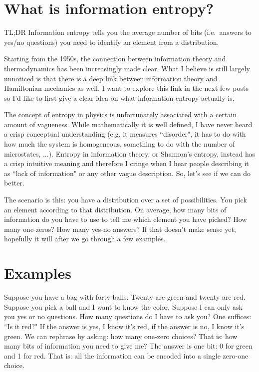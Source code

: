 \documentclass[aps,pra,10pt,floatfix,nofootinbib]{revtex4-1}
\theoremstyle{definition}
\begin{document}
	
\section{What is information entropy?}

TL;DR Information entropy tells you the average number of bits (i.e.~answers to yes/no questions) you need to identify an element from a distribution.

Starting from the 1950s, the connection between information theory and thermodynamics has been increasingly made clear. What I believe is still largely unnoticed is that there is a deep link between information theory and Hamiltonian mechanics as well. I want to explore this link in the next few posts so I'd like to first give a clear idea on what information entropy actually is.

The concept of entropy in physics is unfortunately associated with a certain amount of vagueness. While mathematically it is well defined, I have never heard a crisp conceptual understanding (e.g. it measures ``disorder", it has to do with how much the system is homogeneous, something to do with the number of microstates, ...). Entropy in information theory, or Shannon's entropy, instead has a crisp intuitive meaning and therefore I cringe when I hear people describing it as ``lack of information" or any other vague description. So, let's see if we can do better.

The scenario is this: you have a distribution over a set of possibilities. You pick an element according to that distribution. On average, how many bits of information do you have to use to tell me which element you have picked? How many one-zeros? How many yes-no answers? If that doesn't make sense yet, hopefully it will after we go through a few examples.

\section{Examples}

Suppose you have a bag with forty balls. Twenty are green and twenty are red. Suppose you pick a ball and I want to know the color. Suppose I can only ask you yes or no questions. How many questions do I have to ask you? One suffices: ``Is it red?" If the answer is yes, I know it's red, if the answer is no, I know it's green. We can rephrase by asking: how many one-zero choices? That is: how many bits of information you need to give me? The answer is one bit: 0 for green and 1 for red. That is: all the information can be encoded into a single zero-one choice.
\end{document}
